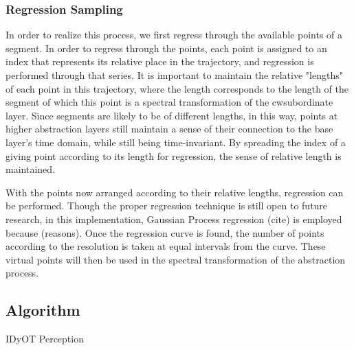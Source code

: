 \documentclass[runningheads]{llncs}
\begin{document}

\subsubsection{Regression Sampling}

In order to realize this process, we first regress through the available points of a segment.  In order to regress through the points, each point is assigned to an index that represents its relative place in the trajectory, and regression is performed through that series.  It is important to maintain the relative "lengths" of each point in this trajectory, where the length corresponds to the length of the segment of which this point is a spectral transformation of the cwsubordinate layer.  Since segments are likely to be of different lengths, in this way, points at higher abstraction layers still maintain a sense of their connection to the base layer's time domain, while still being time-invariant.  By spreading the index of a giving point according to its length for regression, the sense of relative length is maintained.

With the points now arranged according to their relative lengths, regression can be performed. Though the proper regression technique is still open to future research, in this implementation, Gaussian Process regression (cite) is employed because (reasons).  Once the regression curve is found, the number of points according to the resolution is taken at equal intervals from the curve.  These virtual points will then be used in the spectral transformation of the abstraction process.



\subsection{Algorithm}


\begin{algorithm}[H]
  \caption{IDyOT Perception}
\end{algorithm}


\end{document}
